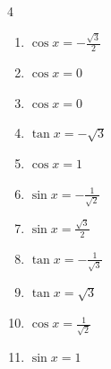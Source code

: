 \begin{multicols}{4}
\begin{enumerate}
  \item $\displaystyle \cos{x}  = -\frac{\sqrt{3}}{2}$


  \item $\displaystyle \cos{x}  = 0$


  \item $\displaystyle \cos{x}  = 0$


  \item $\displaystyle \tan{x}  = -\sqrt{3}$


  \item $\displaystyle \cos{x}  = 1$

        \phantom{$\displaystyle x = 0$}

\columnbreak %

  \item $\displaystyle \sin{x}  = -\frac{1}{\sqrt{2}}$


  \item $\displaystyle \sin{x}  = \frac{\sqrt{3}}{2}$


  \item $\displaystyle \tan{x}  = -\frac{1}{\sqrt{3}}$


  \item $\displaystyle \tan{x}  = \sqrt{3}$


  \item $\displaystyle \cos{x}  = \frac{1}{\sqrt{2}}$


  \item $\displaystyle \sin{x}  = 1$



\end{enumerate}
\end{multicols}
